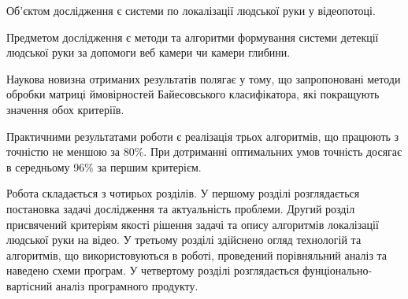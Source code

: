 Об'єктом дослідження є системи по локалізації людської руки у відеопотоці.

Предметом дослідження є методи та алгоритми формування системи детекції людської руки за допомоги веб камери чи камери глибини.

Наукова новизна отриманих результатів полягає у тому, що запропоновані методи обробки матриці ймовірностей Байесовського класифікатора, які покращують значення обох критеріїв. 

Практичними результатами роботи є реалізація трьох алгоритмів, що працюють з точністю не меншою за 80\%. При дотриманні оптимальних умов точність досягає в середньому 96\% за першим критерієм.

Робота складається з чотирьох розділів. У першому розділі розглядається постановка задачі дослідження та актуальність проблеми. Другий розділ присвячений критеріям якості рішення задачі та опису алгоритмів локалізації людської руки на відео. У третьому розділі здійснено огляд технологій та алгоритмів, що використовуються в роботі, проведений порівняльний аналіз та наведено схеми програм. У четвертому розділі розглядається фунціонально-вартісний аналіз програмного продукту.
